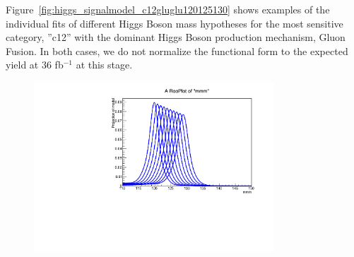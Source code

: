 Figure~\ref{fig:higgs_signalmodel_c12gluglu120125130} shows examples of the individual fits of different Higgs Boson mass hypotheses for the most sensitive category,  ''c12'' with the dominant Higgs Boson production mechanism, Gluon Fusion. In both cases, we do not normalize the functional form to the expected yield at 36 fb$^{-1}$ at this stage.
 \begin{figure}[H]
     \centering
     \includegraphics[width=0.8\textwidth]{figures/signal_model/AppendixBdt/interpolation_GluGlu_cat12.pdf}
     \caption{}
     \label{fig:higgs_signalmodel_c12glugluinterp}
 \end{figure}
